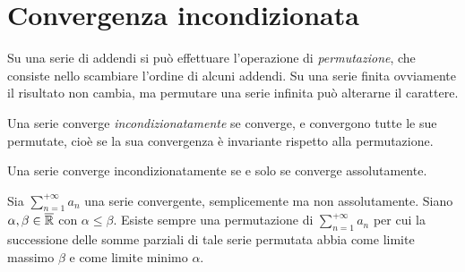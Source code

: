 \section{Convergenza incondizionata}
Su una serie di addendi si può effettuare l'operazione di \emph{permutazione}, che consiste nello scambiare l'ordine di alcuni addendi. Su una serie finita ovviamente il risultato non cambia, ma permutare una serie infinita può alterarne il carattere.
\begin{definizione}
Una serie converge \emph{incondizionatamente} se converge, e convergono tutte le sue permutate, cioè se la sua convergenza è invariante rispetto alla permutazione.
\end{definizione}
\begin{teorema}
Una serie converge incondizionatamente se e solo se converge assolutamente.
\end{teorema}
\begin{teorema}[Riemann]
Sia $\sum_{n=1}^{+\infty}a_n$ una serie convergente, semplicemente ma non assolutamente. Siano $\alpha,\beta\in\overline{\mathbb{R}}$ con $\alpha\leq\beta$. Esiste sempre una permutazione di $\sum_{n=1}^{+\infty}a_n$ per cui la successione delle somme parziali di tale serie permutata abbia come limite massimo $\beta$ e come limite minimo $\alpha$.
\end{teorema}

